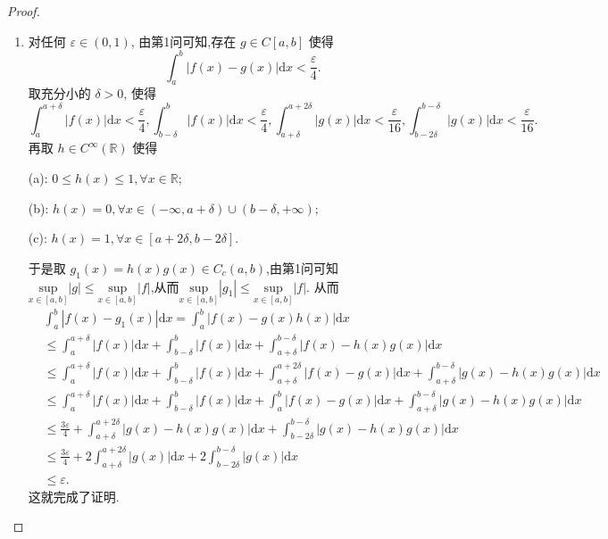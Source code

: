 \documentclass[../../main.tex]{subfiles}%
\begin{document}
\begin{proof}
\begin{enumerate}[(1)]
\item 对任何 $\varepsilon \in (0,1)$, 由第1问可知,存在 $g \in C[a,b]$ 使得
\[
\int_{a}^{b} |f(x) - g(x)|\mathrm{d}x < \frac{\varepsilon}{4}.
\]
取充分小的 $\delta > 0$, 使得
\[
\int_{a}^{a + \delta} |f(x)|\mathrm{d}x < \frac{\varepsilon}{4}, \int_{b - \delta}^{b} |f(x)|\mathrm{d}x < \frac{\varepsilon}{4}, \int_{a + \delta}^{a + 2\delta} |g(x)|\mathrm{d}x < \frac{\varepsilon}{16}, \int_{b - 2\delta}^{b - \delta} |g(x)|\mathrm{d}x < \frac{\varepsilon}{16}.
\]
再取 $h \in C^{\infty}(\mathbb{R})$ 使得

(a): $0 \leqslant h(x) \leqslant 1, \forall x \in \mathbb{R}$;

(b): $h(x) = 0, \forall x \in (-\infty,a + \delta) \cup (b - \delta,+\infty)$;

(c): $h(x) = 1, \forall x \in [a + 2\delta,b - 2\delta]$.

于是取 $g_1(x) = h(x)g(x) \in C_c(a,b)$,由第1问可知$\underset{x\in \left[ a,b \right]}{\mathrm{sup}}\left| g \right|\leqslant \underset{x\in \left[ a,b \right]}{\mathrm{sup}}\left| f \right|$,从而$\underset{x\in \left[ a,b \right]}{\mathrm{sup}}\left| g_1 \right|\leqslant \underset{x\in \left[ a,b \right]}{\mathrm{sup}}\left| f \right|$.
从而
\begin{align*}
&\int_{a}^{b} |f(x) - g_1(x)|\mathrm{d}x = \int_{a}^{b} |f(x) - g(x)h(x)|\mathrm{d}x \\
&\leqslant \int_{a}^{a + \delta} |f(x)|\mathrm{d}x + \int_{b - \delta}^{b} |f(x)|\mathrm{d}x + \int_{a + \delta}^{b - \delta} |f(x) - h(x)g(x)|\mathrm{d}x \\
&\leqslant \int_{a}^{a + \delta} |f(x)|\mathrm{d}x + \int_{b - \delta}^{b} |f(x)|\mathrm{d}x + \int_{a + \delta}^{a + 2\delta} |f(x) - g(x)|\mathrm{d}x + \int_{a + \delta}^{b - \delta} |g(x) - h(x)g(x)|\mathrm{d}x \\
&\leqslant \int_{a}^{a + \delta} |f(x)|\mathrm{d}x + \int_{b - \delta}^{b} |f(x)|\mathrm{d}x + \int_{a}^{b} |f(x) - g(x)|\mathrm{d}x + \int_{a + \delta}^{b - \delta} |g(x) - h(x)g(x)|\mathrm{d}x \\
&\leqslant \frac{3\varepsilon}{4} + \int_{a + \delta}^{a + 2\delta} |g(x) - h(x)g(x)|\mathrm{d}x + \int_{b - 2\delta}^{b - \delta} |g(x) - h(x)g(x)|\mathrm{d}x \\
&\leqslant \frac{3\varepsilon}{4} + 2 \int_{a + \delta}^{a + 2\delta} |g(x)|\mathrm{d}x + 2 \int_{b - 2\delta}^{b - \delta} |g(x)|\mathrm{d}x \\
&\leqslant \varepsilon.
\end{align*}
这就完成了证明.


\end{enumerate}
\end{proof}
\end{document}
